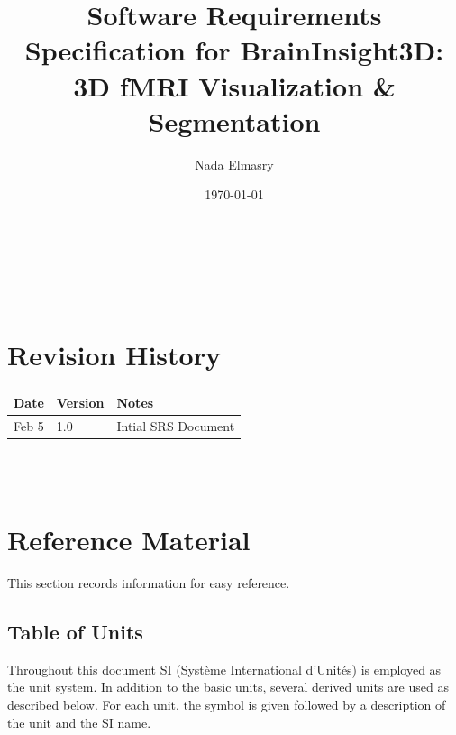 \documentclass[12pt]{article}
\begin{document}
\title{Software Requirements Specification for BrainInsight3D: 3D fMRI
  Visualization \& Segmentation}
\author{Nada Elmasry}
\date{\today}

\maketitle

~\newpage


\tableofcontents

~\newpage

\section*{Revision History}

\begin{tabularx}{\textwidth}{p{3cm}p{2cm}X}
  \toprule {\bf Date} & {\bf Version} & {\bf Notes}         \\
  \midrule
  Feb 5               & 1.0           & Intial SRS Document \\
  \bottomrule
\end{tabularx}

~\\


~\newpage

\section{Reference Material}

This section records information for easy reference.

\subsection{Table of Units}

Throughout this document SI (Syst\`{e}me International d'Unit\'{e}s) is employed
as the unit system.  In addition to the basic units, several derived units are
used as described below.  For each unit, the symbol is given followed by a
description of the unit and the SI name.
~\newline
\end{document}

